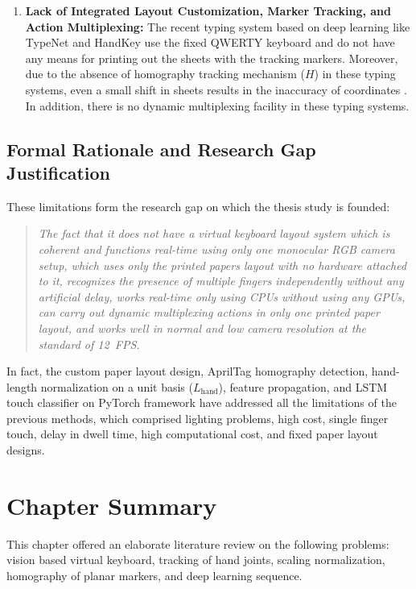 \begin{enumerate}
    \item \textbf{Lack of Integrated Layout Customization, Marker Tracking, and Action Multiplexing:} The recent typing system based on deep learning like TypeNet \cite{Maman2023TypeNet} and HandKey \cite{Enkhbat2020HandKey} use the fixed QWERTY keyboard and do not have any means for printing out the sheets with the tracking markers. Moreover, due to the absence of homography tracking mechanism ($H$) in these typing systems, even a small shift in sheets results in the inaccuracy of coordinates \cite{Wang2016AprilTag2, Kallwies2020Determining, Pirchheim2011Homography}. In addition, there is no dynamic multiplexing facility in these typing systems.
\end{enumerate}

\subsection{Formal Rationale and Research Gap Justification}
These limitations form the research gap on which the thesis study is founded:

\begin{quote}
\emph{The fact that it does not have a virtual keyboard layout system which is coherent and functions real-time using only one monocular RGB camera setup, which uses only the printed papers layout with no hardware attached to it, recognizes the presence of multiple fingers independently without any artificial delay, works real-time only using CPUs without using any GPUs, can carry out dynamic multiplexing actions in only one printed paper layout, and works well in normal and low camera resolution at the standard of 12~FPS.}
\end{quote}

In fact, the custom paper layout design, AprilTag homography detection, hand-length normalization on a unit basis ($L_{\text{hand}}$), feature propagation, and LSTM touch classifier on PyTorch framework have addressed all the limitations of the previous methods, which comprised lighting problems, high cost, single finger touch, delay in dwell time, high computational cost, and fixed paper layout designs.

\section{Chapter Summary}
\label{sec:lit_chapter_summary}
This chapter offered an elaborate literature review on the following problems: vision based virtual keyboard, tracking of hand joints, scaling normalization, homography of planar markers, and deep learning sequence.

